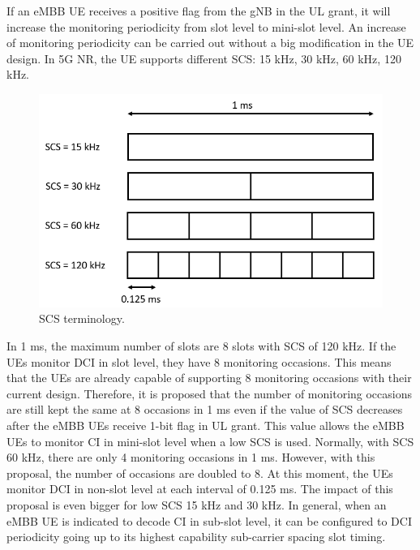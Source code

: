 \documentclass{ieeeaccess}
\begin{document}
If an eMBB UE receives a positive flag from the gNB in the UL grant, it will increase the monitoring periodicity from slot level to mini-slot level. An increase of monitoring periodicity can be carried out without a big modification in the UE design. In 5G NR, the UE supports different SCS: 15 kHz, 30 kHz, 60 kHz, 120 kHz. 

\begin{figure}[htbp]
\centerline{\includegraphics[scale=0.3]{fig9.PNG}}
\caption{SCS terminology.}
\label{fig9}
\vspace{-2mm}
\end{figure}

In 1 ms, the maximum number of slots are 8 slots with SCS of 120 kHz. If the UEs monitor DCI in slot level, they have 8 monitoring occasions. This means that the UEs are already capable of supporting 8 monitoring occasions with their current design. Therefore, it is proposed that the number of monitoring occasions are still kept the same at 8 occasions in 1 ms even if the value of SCS decreases after the eMBB UEs receive 1-bit flag in UL grant. This value allows the eMBB UEs to monitor CI in mini-slot level when a low SCS is used. Normally, with SCS 60 kHz, there are only 4 monitoring occasions in 1 ms. However, with this proposal, the number of occasions are doubled to 8. At this moment, the UEs monitor DCI in non-slot level at each interval of 0.125 ms. The impact of this proposal is even bigger for low SCS 15 kHz and 30 kHz. In general, when an eMBB UE is indicated to decode CI in sub-slot level, it can be configured to DCI periodicity going up to its highest capability sub-carrier spacing slot timing. 
\end{document}
